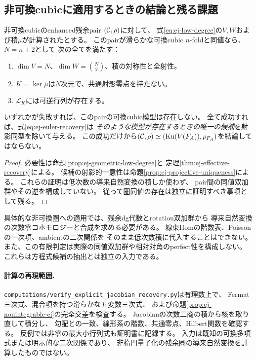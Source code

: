 \subsection{非可換cubicに適用するときの結論と残る課題}

\begin{corollary}[唯一の可換候補を抽出する検査器]
\label{cor:ej-candidate}
非可換cubicのenhanced残余pair $(\mathcal C,\rho)$に対して、
式\eqref{eq:ej-low-degree}の$V,W$および積$\mu$が計算されたとする。
このpairが滑らかな可換cubic $n$-foldと同値なら、$N=n+2$として
次の全てを満たす：
\begin{enumerate}
 \item $\dim V=N$、$\dim W=\binom N2$、積の対称性と全射性。
 \item $K=\ker\bar\mu$は$N$次元で、共通射影零点を持たない。
 \item $\mathcal L_K$には可逆行列が存在する。
\end{enumerate}
いずれかが失敗すれば、このpairの可換cubic模型は存在しない。
全て成功すれば、式\eqref{eq:ej-euler-recovery}は
\emph{そのような模型が存在するときの唯一の候補}を射影同型を除いて与える。
この成功だけから$(\mathcal C,\rho)\simeq(\operatorname{Ku}(V(F_A)),\rho_{F_A})$を結論してはならない。
\end{corollary}
\begin{proof}
必要性は命題\ref{prop:ej-geometric-low-degree}と
定理\ref{thm:ej-effective-recovery}による。
候補の射影的一意性は命題\ref{prop:ej-projective-uniqueness}による。
これらの証明は低次数の導来自然変換の積しか使わず、
pair間の同値双加群やその逆を構成していない。
従って圏同値の存在は独立に証明すべき事項として残る。
\end{proof}

具体的な非可換圏への適用では、残余dg代数とrotation双加群から
導来自然変換の次数零コホモロジーと合成を求める必要がある。
線束Homの階数表、Poissonの一次項、ambientの二次関係を
そのまま低次数積に代入することはできない。
また、この有限判定は実際の同値双加群や相対対角のperfect性を構成しない。
これらは方程式候補の抽出とは独立の入力である。

\paragraph{計算の再現範囲.}
\texttt{computations/verify\_explicit\_jacobian\_recovery.py}は有理数上で、
Fermat三次式、混合項を持つ滑らかな五変数三次式、
および命題\ref{prop:ej-nonintegrable-ci}の完全交差を検査する。
Jacobianの次数二商の積から核を取り直して積分し、
勾配との一致、線形系の階数、共通零点、Hilbert関数を確認する。
反例では非零の最大小行列式も証明書に記録する。
入力は既知の可換多項式または明示的な二次関係であり、
非楕円量子化の残余圏の導来自然変換を計算したものではない。
